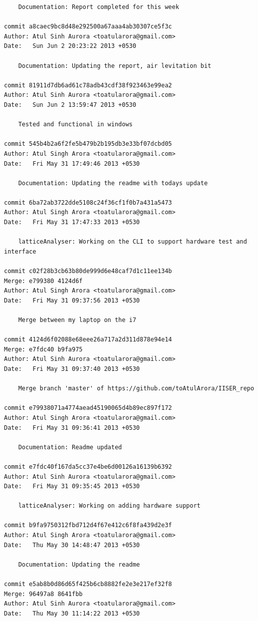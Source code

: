 \begin{lstlisting}
    Documentation: Report completed for this week

commit a8caec9bc8d48e292500a67aaa4ab30307ce5f3c
Author: Atul Sinh Aurora <toatularora@gmail.com>
Date:   Sun Jun 2 20:23:22 2013 +0530

    Documentation: Updating the report, air levitation bit

commit 81911d7db6ad61c78adb43cdf38f923463e99ea2
Author: Atul Sinh Aurora <toatularora@gmail.com>
Date:   Sun Jun 2 13:59:47 2013 +0530

    Tested and functional in windows

commit 545b4b2a6f2fe5b479b2b195db3e33bf07dcbd05
Author: Atul Singh Arora <toatularora@gmail.com>
Date:   Fri May 31 17:49:46 2013 +0530

    Documentation: Updating the readme with todays update

commit 6ba72ab3722dde5108c24f36cf1f0b7a431a5473
Author: Atul Singh Arora <toatularora@gmail.com>
Date:   Fri May 31 17:47:33 2013 +0530

    latticeAnalyser: Working on the CLI to support hardware test and interface

commit c02f28b3cb63b80de999d6e48caf7d1c11ee134b
Merge: e799380 4124d6f
Author: Atul Singh Arora <toatularora@gmail.com>
Date:   Fri May 31 09:37:56 2013 +0530

    Merge between my laptop on the i7

commit 4124d6f02088e68eee26a717a2d311d878e94e14
Merge: e7fdc40 b9fa975
Author: Atul Sinh Aurora <toatularora@gmail.com>
Date:   Fri May 31 09:37:40 2013 +0530

    Merge branch 'master' of https://github.com/toAtulArora/IISER_repo

commit e79938071a4774aead45190065d4b89ec897f172
Author: Atul Singh Arora <toatularora@gmail.com>
Date:   Fri May 31 09:36:41 2013 +0530

    Documentation: Readme updated

commit e7fdc40f167da5cc37e4be6d00126a16139b6392
Author: Atul Sinh Aurora <toatularora@gmail.com>
Date:   Fri May 31 09:35:45 2013 +0530

    latticeAnalyser: Working on adding hardware support

commit b9fa9750312fbd712d4f67e412c6f8fa439d2e3f
Author: Atul Singh Arora <toatularora@gmail.com>
Date:   Thu May 30 14:48:47 2013 +0530

    Documentation: Updating the readme

commit e5ab8b0d86d65f425b6cb8882fe2e3e217ef32f8
Merge: 96497a8 8641fbb
Author: Atul Sinh Aurora <toatularora@gmail.com>
Date:   Thu May 30 11:14:22 2013 +0530


\end{lstlisting}
